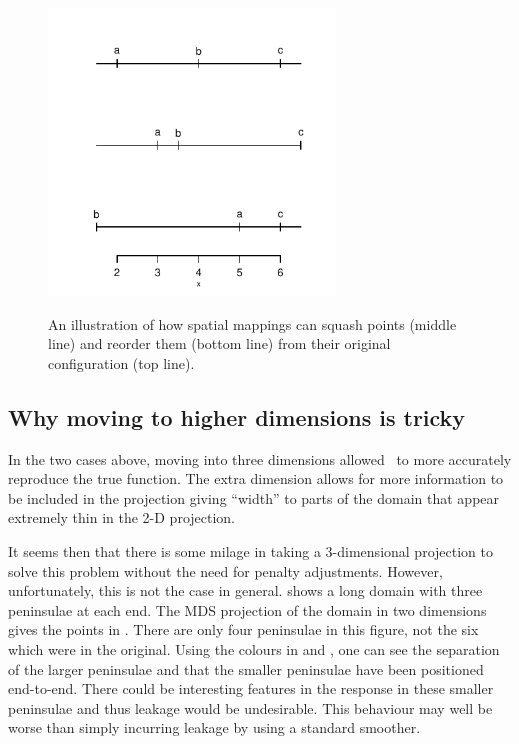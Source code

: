 \begin{figure}
\centering
\includegraphics[width=3in]{mds/figs/linedia.pdf} \\
\caption{An illustration of how spatial mappings can squash points (middle line) and reorder them (bottom line) from their original configuration (top line).}
\label{linedia}
\end{figure}

\subsection{Why moving to higher dimensions is tricky}
\label{nohigherdim}

In the two cases above, moving into three dimensions allowed \mdsap\ to more accurately reproduce the true function. The extra dimension allows for more information to be included in the projection giving ``width'' to parts of the domain that appear extremely thin in the 2-D projection.

It seems then that there is some milage in taking a 3-dimensional projection to solve this problem without the need for penalty adjustments. However, unfortunately, this is not the case in general.  shows a long domain with three peninsulae at each end. The MDS projection of the domain in two dimensions gives the points in . There are only four peninsulae in this figure, not the six which were in the original. Using the colours in  and , one can see the separation of the larger peninsulae and that the smaller peninsulae have been positioned end-to-end. \label{cor-r45}There could be interesting features in the response in these smaller peninsulae and thus leakage would be undesirable. This behaviour may well be worse than simply incurring leakage by using a standard smoother.

